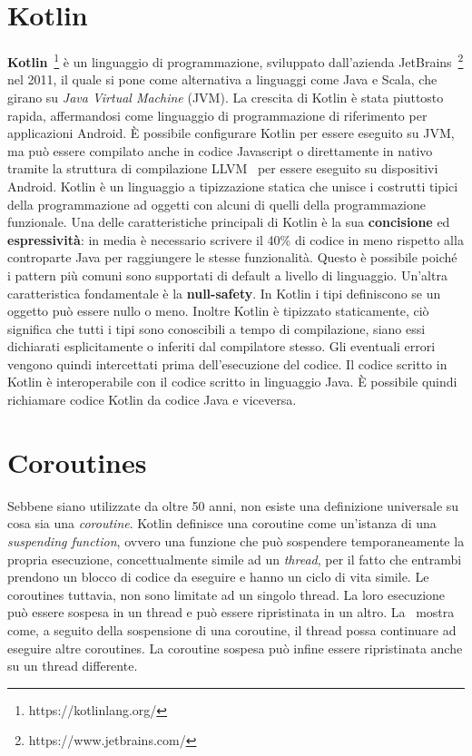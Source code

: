 \documentclass[12pt,a4paper,openright,twoside]{book}
\begin{document}
\section{Kotlin}
\textbf{Kotlin}~\footnote{https://kotlinlang.org/} è un linguaggio di programmazione, sviluppato dall'azienda JetBrains~\footnote{https://www.jetbrains.com/} nel 2011, il quale si pone come alternativa a linguaggi come Java e Scala, che girano su \textit{Java Virtual Machine} (JVM). La crescita di Kotlin è stata piuttosto rapida, affermandosi come linguaggio di programmazione di riferimento per applicazioni Android. 
È possibile configurare Kotlin per essere eseguito su JVM, ma può essere compilato anche in codice Javascript o direttamente in nativo tramite la struttura di compilazione LLVM~\cite{DBLP:conf/lcpc/LattnerA04} per essere eseguito su dispositivi Android. 
Kotlin è un linguaggio a tipizzazione statica che unisce i costrutti tipici della programmazione ad oggetti con alcuni di quelli della programmazione funzionale. 
Una delle caratteristiche principali di Kotlin è la sua \textbf{concisione} ed \textbf{espressività}: in media è necessario scrivere il 40\% di codice in meno rispetto alla controparte Java per raggiungere le stesse funzionalità. Questo è possibile poiché i pattern più comuni sono supportati di default a livello di linguaggio. 
Un'altra caratteristica fondamentale è la \textbf{null-safety}. In Kotlin i tipi definiscono se un oggetto può essere nullo o meno. Inoltre Kotlin è tipizzato staticamente, ciò significa che tutti i tipi sono conoscibili a tempo di compilazione, siano essi dichiarati esplicitamente o inferiti dal compilatore stesso. Gli eventuali errori vengono quindi intercettati prima dell'esecuzione del codice. 
Il codice scritto in Kotlin è interoperabile con il codice scritto in linguaggio Java. È possibile quindi richiamare codice Kotlin da codice Java e viceversa.

\section{Coroutines}
Sebbene siano utilizzate da oltre 50 anni, non esiste una definizione universale su cosa sia una \textit{coroutine}. 
Kotlin definisce una coroutine come un'istanza di una \textit{suspending function}, ovvero una funzione che può sospendere temporaneamente la propria esecuzione, concettualmente simile ad un \textit{thread}, per il fatto che entrambi prendono un blocco di codice da eseguire e hanno un ciclo di vita simile. Le coroutines tuttavia, non sono limitate ad un singolo thread. La loro esecuzione può essere sospesa in un thread e può essere ripristinata in un altro. La~ mostra come, a seguito della sospensione di una coroutine, il thread possa continuare ad eseguire altre coroutines. La coroutine sospesa può infine essere ripristinata anche su un thread differente.  
\end{document}
